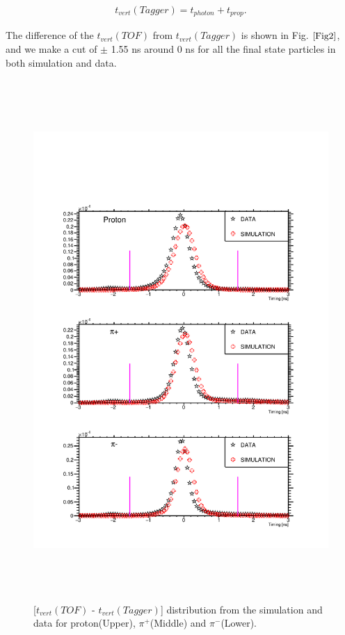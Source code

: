 \begin{eqnarray*}
t_{vert}(Tagger) = t_{photon} + t_{prop}.
\end{eqnarray*}


The difference of the $t_{vert}(TOF)$ from $t_{vert}(Tagger)$ is shown in Fig.$~\ref{Fig2}$, and we make a cut of $\pm$ 1.55 ns around 0 ns for all the final state particles in both simulation and data. 
\begin{figure}[ht!]
\centerline{
\includegraphics[height=7.8in]{timing.pdf}}
\caption{[$t_{vert}(TOF)$ - $t_{vert}(Tagger)$] distribution from the simulation and data for proton(Upper), $\pi^{+}$(Middle) and $\pi^{-}$(Lower).}
\label{Fig2}
\end{figure}

